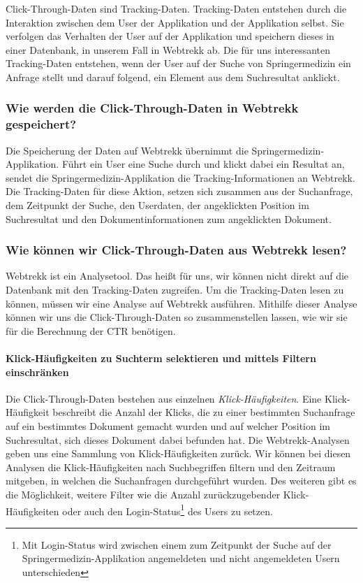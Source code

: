 Click-Through-Daten sind Tracking-Daten. Tracking-Daten entstehen durch die Interaktion zwischen dem User der Applikation und der Applikation selbst. Sie verfolgen das Verhalten der User auf der Applikation und speichern dieses in einer Datenbank, in unserem Fall in Webtrekk ab. Die für uns interessanten Tracking-Daten entstehen, wenn der User auf der Suche von Springermedizin ein Anfrage stellt und darauf folgend, ein Element aus dem Suchresultat anklickt.

\subsubsection{Wie werden die Click-Through-Daten in Webtrekk gespeichert?}
\label{sec:Grundlagen:Grundbegriffe:Click-Through-Daten:SpeichernClick-Through-Daten}

Die Speicherung der Daten auf Webtrekk übernimmt die Springermedizin-Applikation. Führt ein User eine Suche durch und klickt dabei ein Resultat an, sendet die Springermedizin-Applikation die Tracking-Informationen an Webtrekk. Die Tracking-Daten für diese Aktion, setzen sich zusammen aus der Suchanfrage, dem Zeitpunkt der Suche, den Userdaten, der angeklickten Position im Suchresultat und den Dokumentinformationen zum angeklickten Dokument.

\subsubsection{Wie können wir Click-Through-Daten aus Webtrekk lesen?}
\label{sec:Grundlagen:Grundbegriffe:Click-Through-Daten:LesenClick-Through-Daten}

Webtrekk ist ein Analysetool. Das heißt für uns, wir können nicht direkt auf die Datenbank mit den Tracking-Daten zugreifen. Um die Tracking-Daten lesen zu können, müssen wir eine Analyse auf Webtrekk ausführen. Mithilfe dieser Analyse können wir uns die Click-Through-Daten so zusammenstellen lassen, wie wir sie für die Berechnung der CTR benötigen.

\paragraph{Klick-Häufigkeiten zu Suchterm selektieren und mittels Filtern einschränken} 
Die Click-Through-Daten bestehen aus einzelnen \textit{Klick-Häufigkeiten}. Eine Klick-Häufigkeit beschreibt die Anzahl der Klicks, die zu einer bestimmten Suchanfrage auf ein bestimmtes Dokument gemacht wurden und auf welcher Position im Suchresultat, sich dieses Dokument dabei befunden hat. Die Webtrekk-Analysen geben uns eine Sammlung von Klick-Häufigkeiten zurück. Wir können bei diesen Analysen die Klick-Häufigkeiten nach Suchbegriffen filtern und den Zeitraum mitgeben, in welchen die Suchanfragen durchgeführt wurden. Des weiteren gibt es die Möglichkeit, weitere Filter wie die Anzahl zurückzugebender Klick-Häufigkeiten oder auch den \glqq Login-Status\footnote{Mit Login-Status wird zwischen einem zum Zeitpunkt der Suche auf der Springermedizin-Applikation angemeldeten und nicht angemeldeten Usern unterschieden} des Users\grqq{} zu setzen. 

